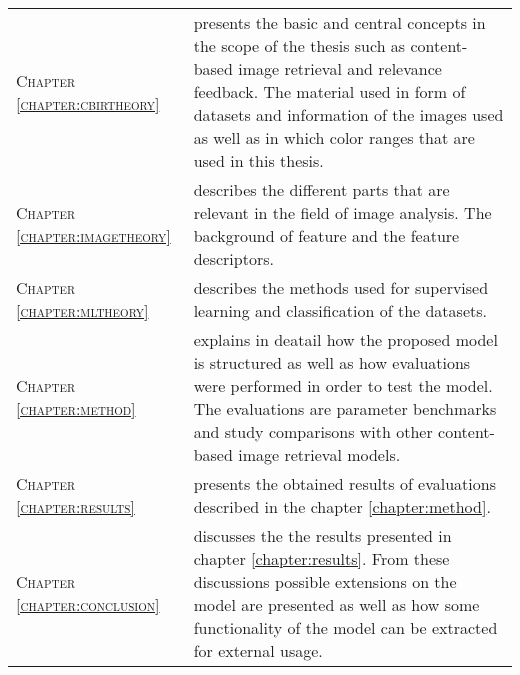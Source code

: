 \begin{tabular}{l p{}}
\textsc{Chapter \ref{chapter:cbirtheory}} & \textbf{\nameref{chapter:cbirtheory}} 
presents the basic and central concepts in the scope of the thesis such as content-based image retrieval and relevance feedback. The material used in form of datasets and information of the images used as well as in which color ranges that are used in this thesis.\\ 
\textsc{Chapter \ref{chapter:imagetheory}} & \textbf{\nameref{chapter:imagetheory}}
describes the different parts that are relevant in the field of image analysis. The background of feature and the feature descriptors.\\ 
\textsc{Chapter \ref{chapter:mltheory}} & \textbf{\nameref{chapter:mltheory}}
describes the methods used for supervised learning and classification of the datasets.\\ 
\textsc{Chapter \ref{chapter:method}} & \textbf{\nameref{chapter:method}}
explains in deatail how the proposed model is structured as well as how evaluations were performed in order to test the model. The evaluations are parameter benchmarks and study comparisons with other content-based image retrieval models.\\ 
\textsc{Chapter \ref{chapter:results}} & \textbf{\nameref{chapter:results}}
presents the obtained results of evaluations described in the chapter \ref{chapter:method}. \\ 
\textsc{Chapter \ref{chapter:conclusion}} & \textbf{\nameref{chapter:conclusion}}
discusses the the results presented in chapter \ref{chapter:results}. From these discussions possible extensions on the model are presented as well as how some functionality of the model can be extracted for external usage.\\ 
\end{tabular}
